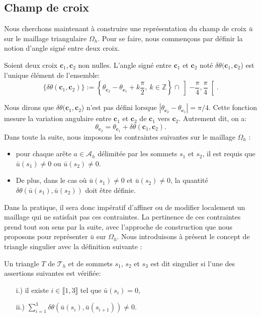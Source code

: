 \subsection{Champ de croix}

Nous cherchons maintenant à construire une représentation du champ de croix $\bar{u}$ sur le maillage triangulaire $\Omega_h$. Pour se faire, nous commençons par définir la notion d'angle signé entre deux croix.

\begin{definition}
Soient deux croix $\mathbf{c}_1,\mathbf{c}_2$ non nulles. L'angle signé entre $\mathbf{c}_1$ et $\mathbf{c}_2$ noté $\delta\theta(\mathbf{c}_1,\mathbf{c}_2$) est l'unique élément de l'ensemble:
$$
\{\delta\theta(\mathbf{c}_1,\mathbf{c}_2)\}:=\left\{\theta_{\mathbf{c}_2}-\theta_{\mathbf{c}_1}+k\frac{\pi}{2},~k\in\mathbb{Z}\right\}\cap\left]-\frac{\pi}{4}, \frac{\pi}{4}\right[.
$$
\end{definition}
Nous dirons que $\delta\theta(\mathbf{c}_1,\mathbf{c}_2$) n'est pas défini lorsque $|\theta_{\mathbf{c}_2}-\theta_{\mathbf{c}_1}|=\pi/4$. Cette fonction mesure la variation angulaire entre $\mathbf{c}_1$ et $\mathbf{c}_2$ de $\mathbf{c}_1$ vers $\mathbf{c}_2$. Autrement dit, on a:
$$
\theta_{\mathbf{c}_2}=\theta_{\mathbf{c}_1}+\delta\theta(\mathbf{c}_1,\mathbf{c}_2).
$$
Dans toute la suite, nous imposons les contraintes suivantes sur le maillage $\Omega_h$ :\\[-0.2cm]
\begin{itemize}
 \item pour chaque arête $a\in\mathcal{A}_h$ délimitée par les sommets $s_1$ et $s_2$, il est requis que $\bar{u}(s_1)\neq 0$ ou $\bar{u}(s_2)\neq 0$.\\[-0.2cm]
 \item De plus, dans le cas où $\bar{u}(s_1)\neq 0$ et $\bar{u}(s_2)\neq 0$, la quantité $\delta\theta(\bar{u}(s_1), \bar{u}(s_2))$ doit être définie.\\[-0.2cm]
\end{itemize}
Dans la pratique, il sera donc impératif d'affiner ou de modifier localement un maillage qui ne satisfait pas ces contraintes. La pertinence de ces contraintes prend tout son sens par la suite, avec l'approche de construction que nous proposons pour représenter $\bar{u}$ sur $\Omega_h$. Nous introduisons à présent le concept de triangle singulier avec la définition suivante :

\begin{definition}
\label{def:triangle_singulier}
 Un triangle $T$ de $\mathcal{T}_h$ et de sommets $s_1$, $s_2$ et $s_3$ est dit singulier si l'une des assertions suivantes est vérifiée:\\[-0.2cm]
 \begin{itemize}
  \item[i.)] il existe $i\in\llbracket 1, 3\rrbracket$ tel que $\bar{u}(s_i)=0$,\\[-0.2cm]
  \item[ii.)] $\sum_{i=1}^3\delta\theta(\bar{u}(s_i),\bar{u}(s_{i+1}))\neq 0$.
 \end{itemize}

\end{definition}

